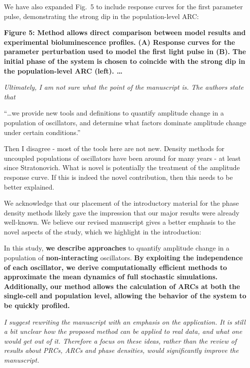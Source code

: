 \documentclass[11pt, letterpaper]{article}
\newenvironment{reviewer}{\itshape\color{gray}}{}
\newenvironment{manuscript}[1]{\begin{center}\begin{tcolorbox}[colback=green!5!white,colframe=green!75!black,width=0.8\textwidth,title={#1},breakable,fonttitle=\bfseries]}{\end{tcolorbox}\end{center}}
\begin{document}
We have also expanded Fig.~5 to include response curves for the first parameter pulse, demonstrating the strong dip in the population-level ARC:

\begin{manuscript}{Page 17}
\bfseries
Figure 5: Method allows direct comparison between model results and experimental bioluminescence profiles.
({\bfseries A}) Response curves for the parameter perturbation used to model the first light pulse in (B).
The initial phase of the system is chosen to coincide with the strong dip in the population-level ARC (left). \dots
\end{manuscript}


\begin{reviewer}
Ultimately, I am not sure what the point of the manuscript is. The authors state that 
 
``\dots we provide new tools and definitions to quantify amplitude change in a population of oscillators, and determine what factors dominate amplitude change under certain conditions.''
 
Then I disagree - most of the tools here are not new.
Density methods for uncoupled populations of oscillators have been around for many years - at least since Stratonovich.
What is novel is potentially the treatment of the amplitude response curve.
If this is indeed the novel contribution, then this needs to be better explained.
\end{reviewer}

We acknowledge that our placement of the introductory material for the phase density methods likely gave the impression that our major results were already well-known.
We believe our revised manuscript gives a better emphasis to the novel aspects of the study, which we highlight in the introduction:

\begin{manuscript}{Page 4}
In this study, {\bfseries we describe approaches} to quantify amplitude change in a population of {\bfseries non-interacting} oscillators.
{\bfseries By exploiting the independence of each oscillator, we derive computationally efficient methods to approximate the mean dynamics of full stochastic simulations.
Additionally, our method allows the calculation of ARCs at both the single-cell and population level, allowing the behavior of the system to be quickly profiled.}
\end{manuscript}

\begin{reviewer}
I suggest rewriting the manuscript with an emphasis on the application.
It is still a bit unclear how the proposed method can be applied to real data, and what one would get out of it.
Therefore a focus on these ideas, rather than the review of results about PRCs, ARCs and phase densities, would significantly improve the manuscript.
\end{reviewer}
 
\end{document}
